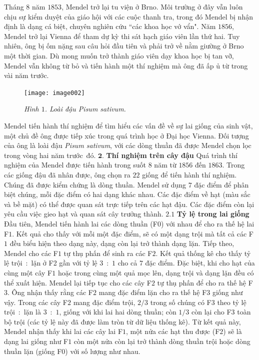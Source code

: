 \begin{multicols}{2}
	\vskip 0.1cm
	Tháng $8$ năm $1853$, Mendel trở lại tu viện ở Brno. Môi trường ở đây vẫn luôn chịu sự kiểm duyệt của giáo hội với các cuộc thanh tra, trong đó Mendel bị nhận định là dạng cá biệt, chuyên nghiên cứu ``các khoa học vớ vẩn". Năm $1856$, Mendel trở lại Vienna để tham dự kỳ thi sát hạch giáo viên lần thứ hai. Tuy nhiên, ông bị ốm nặng sau câu hỏi đầu tiên và phải trở về nằm giường ở Brno một thời gian. Dù mong muốn trở thành giáo viên dạy khoa học bị tan vỡ, Mendel vẫn không từ bỏ và tiến hành một thí nghiệm mà ông đã ấp ủ từ trong vài năm trước.
	\begin{figure}[H]
		\centering
		\vspace*{-5pt}
		\captionsetup{labelformat= empty, justification=centering}
		\texttt{[image: image002]}
		\caption{\small\textit{\color{timhieukhoahoc}Hình $1$. Loài đậu Pisum sativum.}}
		\vspace*{-5pt}
	\end{figure}
	Mendel tiến hành thí nghiệm để tìm hiểu các vấn đề về sự lai giống của sinh vật, một chủ đề ông được tiếp xúc trong quá trình học ở Đại học Vienna. Đối tượng của ông là loài đậu \textit{Pisum sativum}, với các dòng thuần đã được Mendel chọn lọc trong vòng hai năm trước~đó.
	\vskip 0.1cm
	$\pmb{2.}$ \textbf{\color{timhieukhoahoc}Thí nghiệm trên cây đậu}
	\vskip 0.1cm
	Quá trình thí nghiệm của Mendel được tiến hành trong suốt $8$ năm từ $1856$ đến $1863$. Trong các giống đậu đã nhân được, ông chọn ra $22$ giống để tiến hành thí nghiệm. Chúng đã được kiểm chứng là dòng thuần. Mendel sử dụng $7$ đặc điểm để phân biệt chúng, mỗi đặc điểm có hai dạng khác nhau. Các đặc điểm về hạt (màu sắc và bề mặt) có thể được quan sát trực tiếp trên các hạt đậu. Các đặc điểm còn lại yêu cầu việc gieo hạt và quan sát cây trưởng thành.
	\vskip 0.1cm
	$\pmb{2.1}$ \textbf{\color{timhieukhoahoc}Tỷ lệ trong lai giống}
	\vskip 0.1cm
	Đầu tiên, Mendel tiến hành lai các dòng thuần (F$0$) với nhau để cho ra thế hệ lai F$1$. Kết quả cho thấy với mỗi một đặc điểm, sẽ có một dạng trội mà tất cả các F$1$ đều biểu hiện theo dạng này, dạng còn lại trở thành dạng lặn. Tiếp theo, Mendel cho các F$1$ tự thụ phấn để sinh ra các F$2$. Kết quả thống kê cho thấy tỷ lệ trội~:~lặn ở F2 gần với tỷ lệ $3$~:~$1$ cho cả $7$ đặc điểm. Đặc biệt, khi cho hạt của cùng một cây F$1$ hoặc trong cùng một quả mọc lên, dạng trội và dạng lặn đều có thể xuất hiện.
	\vskip 0.1cm
	Mendel lại tiếp tục cho các cây F$2$ tự thụ phấn để cho ra thế hệ F$3$. Ông nhận thấy rằng các F$2$ mang đặc điểm lặn cho ra thế hệ F$3$ giống như vậy. Trong các cây F$2$ mang đặc điểm trội, $2/3$ trong số chúng có F$3$ theo tỷ lệ trội~:~lặn là $3$~:~$1$, giống với khi lai hai dòng thuần; còn $1/3$ còn lại cho F$3$ toàn bộ trội (các tỷ lệ này đã được làm tròn từ dữ liệu thống kê). Từ kết quả này, Mendel nhận thấy khi lai các cây lai F$1$, một nửa các hạt thu được (F$2$) sẽ là dạng lai giống như F$1$ còn một nửa còn lại trở thành dòng thuần trội hoặc dòng thuần lặn (giống F$0$) với số lượng như nhau.

\end{multicols}
